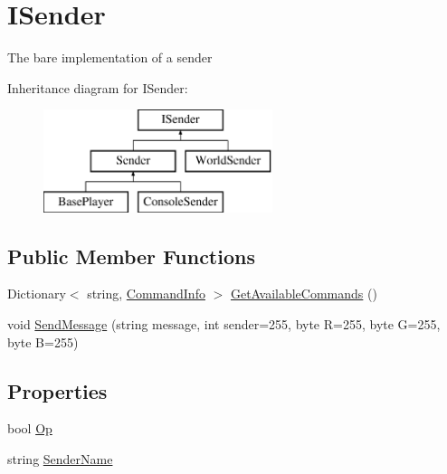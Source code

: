\hypertarget{interfaceOTA_1_1Command_1_1ISender}{}\section{I\+Sender}
\label{interfaceOTA_1_1Command_1_1ISender}


The bare implementation of a sender  


Inheritance diagram for I\+Sender\+:\begin{figure}[H]
\begin{center}
\leavevmode
\includegraphics[height=3.000000cm]{interfaceOTA_1_1Command_1_1ISender}
\end{center}
\end{figure}
\subsection*{Public Member Functions}
\begin{DoxyCompactItemize}
\item 
Dictionary$<$ string, \hyperlink{classOTA_1_1Command_1_1CommandInfo}{Command\+Info} $>$ \hyperlink{interfaceOTA_1_1Command_1_1ISender_a815cfd7f711a32a0f3c4c8b129d08c01}{Get\+Available\+Commands} ()
\item 
void \hyperlink{interfaceOTA_1_1Command_1_1ISender_a061eb30c76097e9fec57819bbe379599}{Send\+Message} (string message, int sender=255, byte R=255, byte G=255, byte B=255)
\end{DoxyCompactItemize}
\subsection*{Properties}
\begin{DoxyCompactItemize}
\item 
bool \hyperlink{interfaceOTA_1_1Command_1_1ISender_a21ba9f1622dc7475d067844accea3cf6}{Op}
\item 
string \hyperlink{interfaceOTA_1_1Command_1_1ISender_a8435cbd7a4dda595164d4ff47d4f4525}{Sender\+Name}
\end{DoxyCompactItemize}



